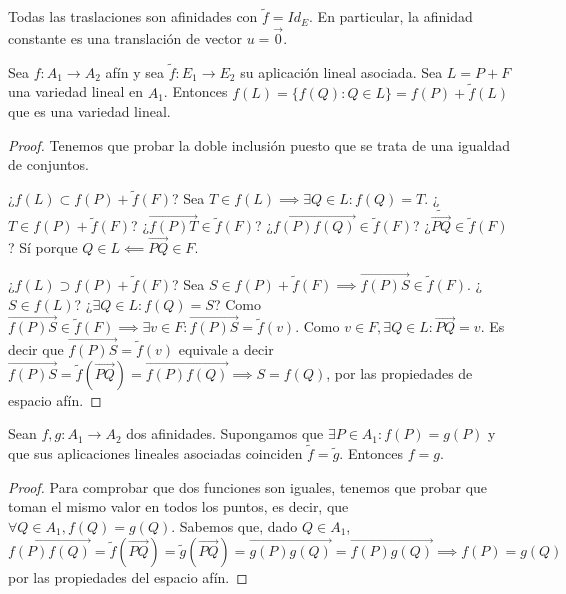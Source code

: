 \documentclass[14pt]{book}
\begin{document}
\begin{obs}
	Todas las traslaciones son afinidades con $\tilde{f} = Id_E$. En particular, la afinidad constante es una translación de vector $u = \vec{0}$.
\end{obs}

\begin{pro}
	Sea $f: A_1 \to A_2$ afín y sea $\tilde{f} : E_1 \to E_2$ su aplicación lineal asociada. Sea $L = P + F$ una variedad lineal en $A_1$. Entonces $f(L) = \{f(Q) : Q \in L\} = f(P) + \tilde{f}(L)$ que es una variedad lineal.
\end{pro}

\begin{proof}
	Tenemos que probar la doble inclusión puesto que se trata de una igualdad de conjuntos.
	
	¿$f(L) \subset f(P) + \tilde{f}(F)$? Sea $T \in f(L) \implies \exists Q \in L : f(Q) = T$. ¿$T \in f(P) + \tilde{f}(F)$? ¿$\overrightarrow{f(P) T} \in \tilde{f}(F)$? ¿$\overrightarrow{f(P) f(Q)} \in \tilde{f}(F)$? ¿$\tilde{\overrightarrow{PQ}} \in \tilde{f}(F)$? Sí porque $Q \in L \impliedby \overrightarrow{PQ} \in F$.
	
	¿$f(L) \supset f(P) + \tilde{f}(F)$? Sea $S \in f(P) + \tilde{f}(F) \implies \overrightarrow{f(P)S} \in \tilde{f}(F)$. ¿$S \in f(L)$? ¿$\exists Q \in L : f(Q) = S$? Como $\overrightarrow{f(P)S} \in \tilde{f}(F) \implies \exists v \in F : \overrightarrow{f(P)S} = \tilde{f}(v)$. Como $v \in F, \exists Q \in L : \overrightarrow{PQ} = v$. Es decir que $\overrightarrow{f(P)S} = \tilde{f}(v)$ equivale a decir $\overrightarrow{f(P)S} = \tilde{f}(\overrightarrow{PQ}) = \overrightarrow{f(P)f(Q)} \implies S = f(Q)$, por las propiedades de espacio afín.
\end{proof}

\begin{pro}
	Sean $f, g : A_1 \to A_2$ dos afinidades. Supongamos que $\exists P \in A_1 : f(P) = g(P)$ y que sus aplicaciones lineales asociadas coinciden $\tilde{f} = \tilde{g}$. Entonces $f = g$.
\end{pro}

\begin{proof}
	Para comprobar que dos funciones son iguales, tenemos que probar que toman el mismo valor en todos los puntos, es decir, que $\forall Q \in A_1, f(Q) = g(Q)$.
	Sabemos que, dado $Q \in A_1$, $\overrightarrow{f(P)f(Q)} = \tilde{f}(\overrightarrow{PQ}) = \tilde{g}(\overrightarrow{PQ}) = \overrightarrow{g(P)g(Q)} = \overrightarrow{f(P)g(Q)} \implies f(P) = g(Q)$ por las propiedades del espacio afín.
\end{proof}
\end{document}
